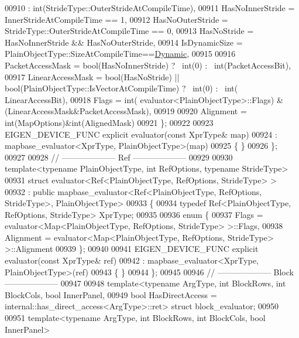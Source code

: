\begin{DoxyCode}
00910                              : int(StrideType::OuterStrideAtCompileTime),
00911     HasNoInnerStride = InnerStrideAtCompileTime == 1,
00912     HasNoOuterStride = StrideType::OuterStrideAtCompileTime == 0,
00913     HasNoStride = HasNoInnerStride && HasNoOuterStride,
00914     IsDynamicSize = PlainObjectType::SizeAtCompileTime==\hyperlink{namespace_eigen_ad81fa7195215a0ce30017dfac309f0b2}{Dynamic},
00915     
00916     PacketAccessMask = bool(HasNoInnerStride) ? ~int(0) : ~int(PacketAccessBit),
00917     LinearAccessMask = bool(HasNoStride) || bool(PlainObjectType::IsVectorAtCompileTime) ? ~int(0) : ~int(
      LinearAccessBit),
00918     Flags = int( evaluator<PlainObjectType>::Flags) & (LinearAccessMask&PacketAccessMask),
00919     
00920     Alignment = int(MapOptions)&int(AlignedMask)
00921   \};
00922 
00923   EIGEN\_DEVICE\_FUNC \textcolor{keyword}{explicit} evaluator(\textcolor{keyword}{const} XprType& map)
00924     : mapbase\_evaluator<XprType, PlainObjectType>(map) 
00925   \{ \}
00926 \};
00927 
00928 \textcolor{comment}{// -------------------- Ref --------------------}
00929 
00930 \textcolor{keyword}{template}<\textcolor{keyword}{typename} PlainObjectType, \textcolor{keywordtype}{int} RefOptions, \textcolor{keyword}{typename} Str\textcolor{keywordtype}{id}eType> 
00931 \textcolor{keyword}{struct }evaluator<Ref<PlainObjectType, RefOptions, StrideType> >
00932   : \textcolor{keyword}{public} mapbase\_evaluator<Ref<PlainObjectType, RefOptions, StrideType>, PlainObjectType>
00933 \{
00934   \textcolor{keyword}{typedef} Ref<PlainObjectType, RefOptions, StrideType> XprType;
00935   
00936   \textcolor{keyword}{enum} \{
00937     Flags = evaluator<Map<PlainObjectType, RefOptions, StrideType> >::Flags,
00938     Alignment = evaluator<Map<PlainObjectType, RefOptions, StrideType> >::Alignment
00939   \};
00940 
00941   EIGEN\_DEVICE\_FUNC \textcolor{keyword}{explicit} evaluator(\textcolor{keyword}{const} XprType& ref)
00942     : mapbase\_evaluator<XprType, PlainObjectType>(ref) 
00943   \{ \}
00944 \};
00945 
00946 \textcolor{comment}{// -------------------- Block --------------------}
00947 
00948 \textcolor{keyword}{template}<\textcolor{keyword}{typename} ArgType, \textcolor{keywordtype}{int} BlockRows, \textcolor{keywordtype}{int} BlockCols, \textcolor{keywordtype}{bool} InnerPanel,
00949          \textcolor{keywordtype}{bool} HasDirectAccess = internal::has\_direct\_access<ArgType>::ret> \textcolor{keyword}{struct }block\_evaluator;
00950          
00951 \textcolor{keyword}{template}<\textcolor{keyword}{typename} ArgType, \textcolor{keywordtype}{int} BlockRows, \textcolor{keywordtype}{int} BlockCols, \textcolor{keywordtype}{bool} InnerPanel> 

\end{DoxyCode}
